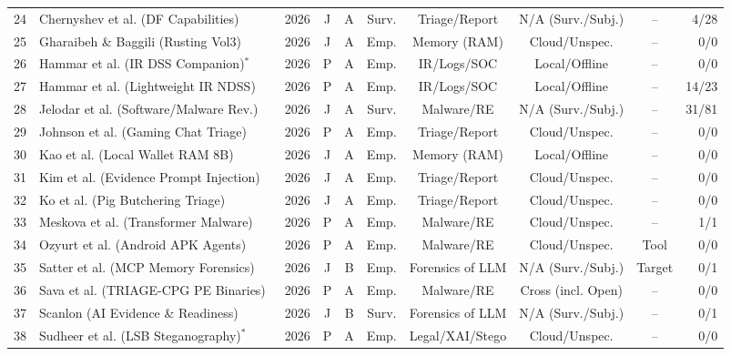 \begin{table}[!t]
\begin{tabular}{rlcccccccr}
24 & Chernyshev et al. (DF Capabilities)~\cite{chernyshev2026_large} & 2026 & J & A & Surv. & Triage/Report & N/A (Surv./Subj.) & -- & 4/28 \\
25 & Gharaibeh \& Baggili (Rusting Vol3)~\cite{gharaibeh2026_rusting} & 2026 & J & A & Emp. & Memory (RAM) & Cloud/Unspec. & -- & 0/0 \\
26 & Hammar et al. (IR DSS Companion)$^*$~\cite{hammar2026_a} & 2026 & P & A & Emp. & IR/Logs/SOC & Local/Offline & -- & 0/0 \\
27 & Hammar et al. (Lightweight IR NDSS)~\cite{hammar2026_incident} & 2026 & P & A & Emp. & IR/Logs/SOC & Local/Offline & -- & 14/23 \\
28 & Jelodar et al. (Software/Malware Rev.)~\cite{jelodar2026_large} & 2026 & J & A & Surv. & Malware/RE & N/A (Surv./Subj.) & -- & 31/81 \\
29 & Johnson et al. (Gaming Chat Triage)~\cite{johnson2026_aiassisted} & 2026 & P & A & Emp. & Triage/Report & Cloud/Unspec. & -- & 0/0 \\
30 & Kao et al. (Local Wallet RAM 8B)~\cite{kao2026_a} & 2026 & J & A & Emp. & Memory (RAM) & Local/Offline & -- & 0/0 \\
31 & Kim et al. (Evidence Prompt Injection)~\cite{kim2026_evidenceborne} & 2026 & J & A & Emp. & Triage/Report & Cloud/Unspec. & -- & 0/0 \\
32 & Ko et al. (Pig Butchering Triage)~\cite{ko2026_humansupervised} & 2026 & J & A & Emp. & Triage/Report & Cloud/Unspec. & -- & 0/0 \\
33 & Meskova et al. (Transformer Malware)~\cite{meskova2026_aidriven} & 2026 & P & A & Emp. & Malware/RE & Cloud/Unspec. & -- & 1/1 \\
34 & Ozyurt et al. (Android APK Agents)~\cite{ozyurt2026_llmorchestrated} & 2026 & P & A & Emp. & Malware/RE & Cloud/Unspec. & Tool & 0/0 \\
35 & Satter et al. (MCP Memory Forensics)~\cite{satter2026_with} & 2026 & J & B & Emp. & Forensics of LLM & N/A (Surv./Subj.) & Target & 0/1 \\
36 & Sava et al. (TRIAGE-CPG PE Binaries)~\cite{sava2026_triagecpg} & 2026 & P & A & Emp. & Malware/RE & Cross (incl. Open) & -- & 0/0 \\
37 & Scanlon (AI Evidence \& Readiness)~\cite{scanlon2026_investigation} & 2026 & J & B & Surv. & Forensics of LLM & N/A (Surv./Subj.) & -- & 0/1 \\
38 & Sudheer et al. (LSB Steganography)$^*$~\cite{sudheer2026_least} & 2026 & P & A & Emp. & Legal/XAI/Stego & Cloud/Unspec. & -- & 0/0 \\

\end{tabular}
\end{table}

